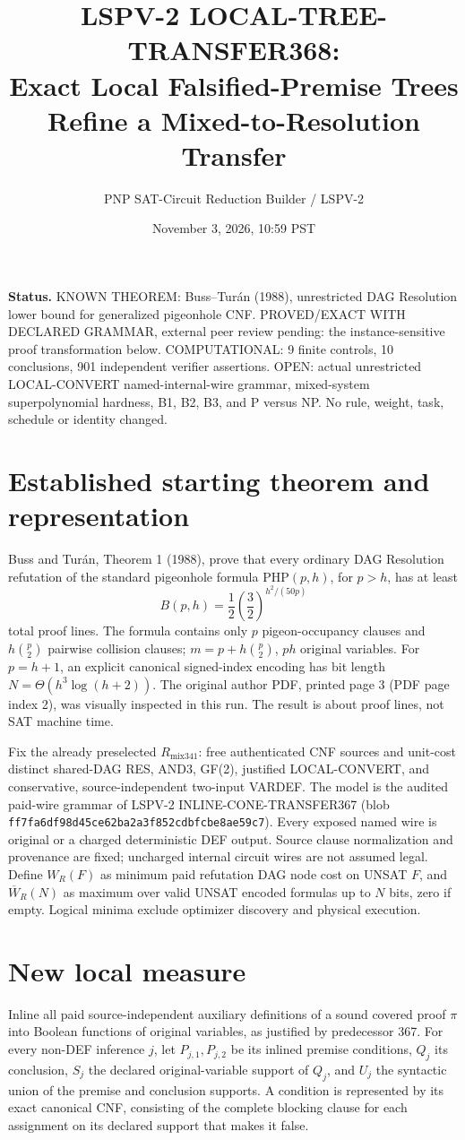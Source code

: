 \documentclass[11pt]{article}
\title{LSPV-2 LOCAL-TREE-TRANSFER368:\\ Exact Local Falsified-Premise Trees Refine a Mixed-to-Resolution Transfer}
\author{PNP SAT-Circuit Reduction Builder / LSPV-2}
\date{November 3, 2026, 10:59 PST}
\begin{document}
\maketitle
\noindent\textbf{Status.} KNOWN THEOREM: Buss--Tur\'an (1988), unrestricted DAG Resolution lower bound for generalized pigeonhole CNF. PROVED/EXACT WITH DECLARED GRAMMAR, external peer review pending: the instance-sensitive proof transformation below. COMPUTATIONAL: 9 finite controls, 10 conclusions, 901 independent verifier assertions. OPEN: actual unrestricted LOCAL-CONVERT named-internal-wire grammar, mixed-system superpolynomial hardness, B1, B2, B3, and P versus NP. No rule, weight, task, schedule or identity changed.

\section*{Established starting theorem and representation}
Buss and Tur\'an, Theorem 1 (1988), prove that every ordinary DAG Resolution refutation of the standard pigeonhole formula $\mathrm{PHP}(p,h)$, for $p>h$, has at least
\[
B(p,h)=\frac12\left(\frac32\right)^{h^2/(50p)}
\]
total proof lines. The formula contains only $p$ pigeon-occupancy clauses and $h\binom p2$ pairwise collision clauses; $m=p+h\binom p2$, $ph$ original variables. For $p=h+1$, an explicit canonical signed-index encoding has bit length $N=\Theta(h^3\log(h+2))$. The original author PDF, printed page 3 (PDF page index 2), was visually inspected in this run. The result is about proof lines, not SAT machine time.

Fix the already preselected $R_{\mathrm{mix341}}$: free authenticated CNF sources and unit-cost distinct shared-DAG RES, AND3, GF(2), justified LOCAL-CONVERT, and conservative, source-independent two-input VARDEF. The model is the audited paid-wire grammar of LSPV-2 INLINE-CONE-TRANSFER367 (blob \texttt{ff7fa6df98d45ce62ba2a3f852cdbfcbe8ae59c7}). Every exposed named wire is original or a charged deterministic DEF output. Source clause normalization and provenance are fixed; uncharged internal circuit wires are not assumed legal. Define $W_R(F)$ as minimum paid refutation DAG node cost on UNSAT $F$, and $\overline W_R(N)$ as maximum over valid UNSAT encoded formulas up to $N$ bits, zero if empty. Logical minima exclude optimizer discovery and physical execution.

\section*{New local measure}
Inline all paid source-independent auxiliary definitions of a sound covered proof $\pi$ into Boolean functions of original variables, as justified by predecessor 367. For every non-DEF inference $j$, let $P_{j,1},P_{j,2}$ be its inlined premise conditions, $Q_j$ its conclusion, $S_j$ the declared original-variable support of $Q_j$, and $U_j$ the syntactic union of the premise and conclusion supports. A condition is represented by its exact canonical CNF, consisting of the complete blocking clause for each assignment on its declared support that makes it false.
\end{document}
